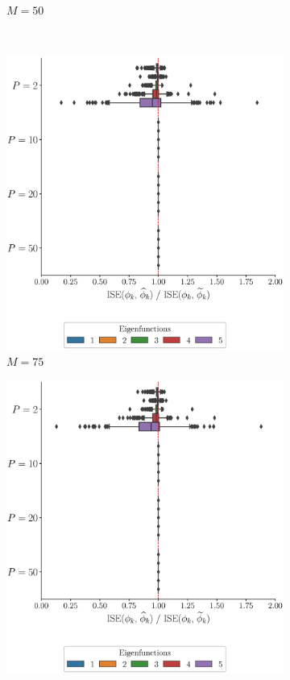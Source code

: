 \begin{results}
\begin{figure}
\begin{subfigure}[b]{0.49\textwidth}
         \caption{$M = 50$}
         \label{fig:ise_mfd_1d_50}
     \end{subfigure}
     \\
     \begin{subfigure}[b]{0.49\textwidth}
         \centering
         \includegraphics[width=\textwidth]{figures/scenario_1/ise_N50_M75.eps}
         \caption{$M = 75$}
         \label{fig:ise_mfd_1d_75}
     \end{subfigure}
     \begin{subfigure}[b]{0.49\textwidth}
         \centering
         \includegraphics[width=\textwidth]{figures/scenario_1/ise_N50_M100.eps}

\end{subfigure}
\end{figure}
\end{results}

